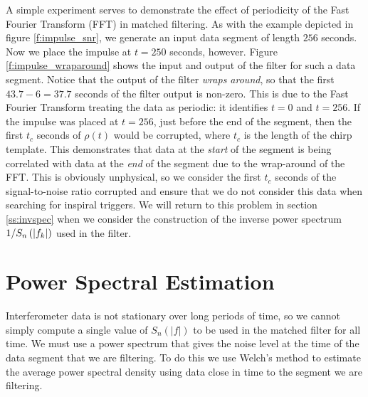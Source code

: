 A simple experiment serves to demonstrate the effect of periodicity of the
Fast Fourier Transform (FFT) in matched filtering. As with
the example depicted in figure \ref{f:impulse_snr}, we generate an input data
segment of length  $256$ seconds. Now we place the impulse at $t = 250$
seconds, however. Figure \ref{f:impulse_wraparound} shows the input and output
of the filter for such a data segment. Notice that the output of the filter
\emph{wraps around}, so that the first $43.7-6 = 37.7$ seconds of the filter
output is non-zero. This is due to the Fast Fourier Transform  treating the
data as periodic: it identifies $t=0$ and $t=256$. If the impulse was
placed at $t=256$, just before the end of the segment, then the first $t_c$
seconds of $\rho(t)$ would be corrupted, where $t_c$ is the length of the chirp
template. This demonstrates that data at the \emph{start} of the segment is
being correlated with data at the \emph{end} of the segment due to the
wrap-around of the FFT. This is obviously unphysical, so we consider the first
$t_c$ seconds of the signal-to-noise ratio corrupted and ensure that we do not
consider this data when searching for inspiral triggers. We will return to
this problem in section \ref{ss:invspec} when we consider the construction of
the inverse power spectrum $1/S_n\left(\left|f_{k}\right|\right)$ used in the filter.

\section{Power Spectral Estimation}
\label{ss:psd}

Interferometer data is not stationary over long periods of time, so we cannot
simply compute a single value of $S_n(|f|)$ to be used in the matched filter
for all time. We must use a power spectrum that gives the noise level at the
time of the data segment that we are filtering. To do this we use Welch's
method\cite{Welch:1967} to estimate the average power spectral density using
data close in time to the segment we are filtering.

